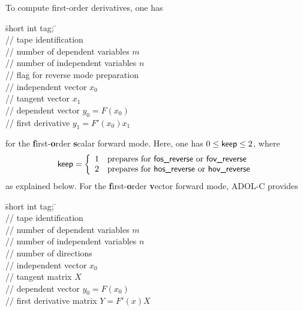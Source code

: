 \documentclass[11pt,twoside]{article}
\begin{document}
To compute first-order derivatives, one has
\begin{tabbing}
\hspace{0.5in}\={\sf short int tag;} \hspace{1.1in}\= \kill    %
\\
         \> // tape identification \\
                 \> // number of  dependent variables $m$\\
                 \> // number of independent variables $n$\\
              \> // flag for reverse mode preparation\\
          \> // independent vector $x_0$\\
          \> // tangent vector $x_1$\\
          \> // dependent vector $y_0=F(x_0)$\\
          \> // first derivative $y_1=F'(x_0)x_1$
\end{tabbing}                 
for the {\bf f}irst-{\bf o}rder {\bf s}calar forward mode. Here, one has
$0\leq\text{\sf keep}\leq 2$, where 
\begin{align*}
\text{\sf keep} = \left\{\begin{array}{cl}
       1 & \text{prepares for {\sf fos\_reverse} or {\sf fov\_reverse}} \\
       2 & \text{prepares for {\sf hos\_reverse} or {\sf hov\_reverse}}
       \end{array}\right.
\end{align*}
as explained below. For the {\bf f}irst-{\bf o}rder {\bf v}ector forward mode,
ADOL-C provides
\begin{tabbing}
\hspace{0.5in}\={\sf short int tag;} \hspace{1.1in}\= \kill    %
\\
         \> // tape identification \\
                 \> // number of  dependent variables $m$\\
                 \> // number of independent variables $n$\\
                 \> // number of directions\\
          \> // independent vector $x_0$\\
        \> // tangent matrix $X$\\
          \> // dependent vector $y_0=F(x_0)$\\
        \> // first derivative matrix $Y=F'(x)X$
\end{tabbing}                 
\end{document}
